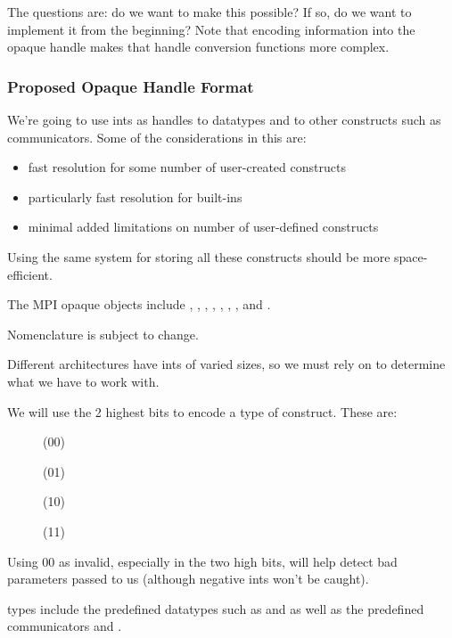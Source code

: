 \documentclass{article}
\begin{document}
The questions are: do we want to make this possible?  If so, do we
want to implement it from the beginning?  Note that encoding
information into the opaque handle makes that handle conversion
functions more complex.

\subsubsection{Proposed Opaque Handle Format}

We're going to use ints as handles to datatypes and to other constructs such
as communicators.  Some of the considerations in this are:
\begin{itemize}
\item fast resolution for some number of user-created constructs
\item particularly fast resolution for built-ins
\item minimal added limitations on number of user-defined constructs 
\end{itemize}

Using the same system for storing all these constructs should be more
space-efficient.

The MPI opaque objects include , ,
, , ,
, , and .

Nomenclature is subject to change.

Different architectures have ints of varied sizes, so we must rely on
 to determine what we have to work with.

We will use the 2 highest bits to encode a type of construct.  These are:
\begin{description}
\item[]  (00)
\item[]  (01)
\item[]   (10)
\item[] (11)
\end{description}

Using 00 as invalid, especially in the two high bits, will help detect
bad parameters passed to us (although negative ints won't be caught).

 types include the predefined datatypes such as
 and  as well as the predefined communicators
 and .
\end{document}
